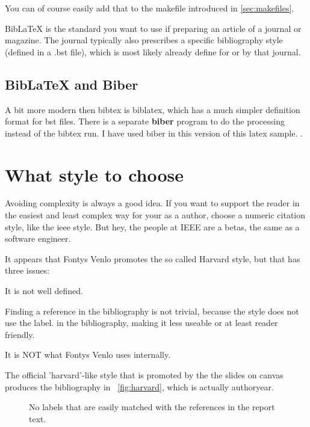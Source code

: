 You can of course easily add that to the makefile introduced in \vref{sec:makefiles}.

BibLaTeX is the standard you want to use if preparing an article of a
journal or magazine. The journal typically also prescribes a specific
bibliography style (defined in a .bst file), which is most likely
already define for or by that journal.

\subsection{BibLaTeX and Biber}

A bit more modern then bibtex is biblatex, which has a much simpler definition
format for bst files. There is a separate \textbf{biber} program to do
the processing instead of the bibtex run.
I have used biber in this version of this latex sample. \parencite{biblatexsite}.

\section{What style to choose}

Avoiding complexity is always a good idea. If you want to support the reader in the easiest and least complex way for your as a author, choose a numeric citation style, like the ieee style. But hey, the people at IEEE are a betas, the same as a software engineer.

It appears that Fontys Venlo promotes the so called Harvard style, but that has three issues:
\begin{Enumerate}
\item It is not well defined.
\item Finding a reference in the bibliography is not trivial, because the style does not use the label.
  in the bibliography, making it less useable or at least reader friendly.
\item It is NOT what Fontys Venlo uses internally.
\end{Enumerate}


The official 'harvard'-like style that is promoted by the the slides on canvas
produces the bibliography in ~\vref{fig:harvard}, which is actually authoryear.

\begin{figure}
  \caption{\label{fig:harvard}No labels that are easily matched with the references in the report text.}
\end{figure}

